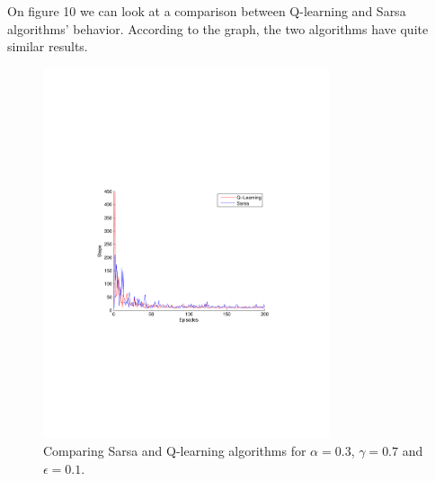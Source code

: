 \documentclass[a4paper,11pt]{article}
\begin{document}
On figure 10 we can look at a comparison between Q-learning and Sarsa algorithms' behavior. According to the graph, the two algorithms have quite similar results.

\begin{figure}[t!]
  \centering
    \includegraphics[trim=4cm 8.5cm 4cm 8.5cm,clip,width=0.75\textwidth]{figures/sarsaQcomp03.pdf}
    \caption{Comparing Sarsa and Q-learning algorithms for $\alpha = 0.3$, $\gamma = 0.7$ and $\epsilon = 0.1$.}
    \label{sarsaQcomp03}
\end{figure}
\end{document}
